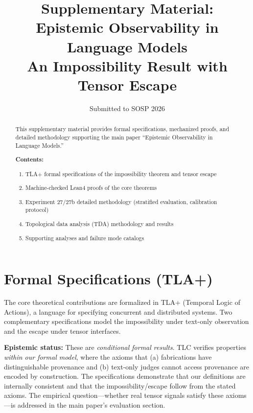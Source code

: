 \documentclass[12pt]{article}
\title{Supplementary Material: \\ Epistemic Observability in Language Models \\
    \normalsize An Impossibility Result with Tensor Escape}
\author{Submitted to SOSP 2026}
\date{}
\begin{document}
\maketitle

\begin{abstract}
This supplementary material provides formal specifications, mechanized proofs, and detailed methodology supporting the main paper ``Epistemic Observability in Language Models.''

\noindent \textbf{Contents:}
\begin{enumerate}
    \item TLA+ formal specifications of the impossibility theorem and tensor escape
    \item Machine-checked Lean4 proofs of the core theorems
    \item Experiment 27/27b detailed methodology (stratified evaluation, calibration protocol)
    \item Topological data analysis (TDA) methodology and results
    \item Supporting analyses and failure mode catalogs
\end{enumerate}

\end{abstract}

\newpage
\tableofcontents
\newpage


\section{Formal Specifications (TLA+)}

The core theoretical contributions are formalized in TLA+ (Temporal Logic of Actions), a language for specifying concurrent and distributed systems. Two complementary specifications model the impossibility under text-only observation and the escape under tensor interfaces.

\textbf{Epistemic status:} These are \emph{conditional formal results}. TLC verifies properties \emph{within our formal model}, where the axioms that (a) fabrications have distinguishable provenance and (b) text-only judges cannot access provenance are encoded by construction. The specifications demonstrate that our definitions are internally consistent and that the impossibility/escape follow from the stated axioms. The empirical question---whether real tensor signals satisfy these axioms---is addressed in the main paper's evaluation section.
\end{document}
